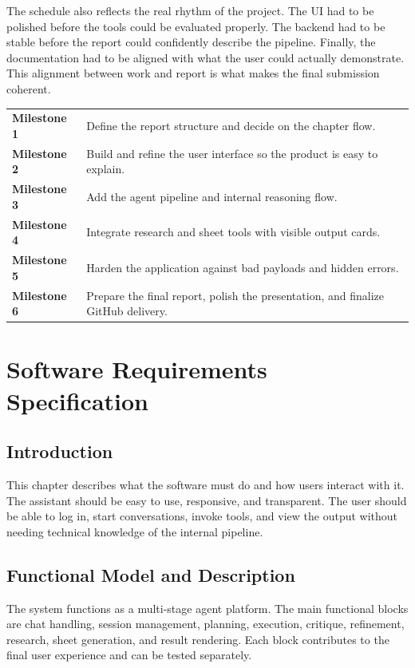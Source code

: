 \documentclass[11pt,oneside]{report}
\begin{document}
The schedule also reflects the real rhythm of the project. The UI had to be polished before the tools could be evaluated properly. The backend had to be stable before the report could confidently describe the pipeline. Finally, the documentation had to be aligned with what the user could actually demonstrate. This alignment between work and report is what makes the final submission coherent.

\begin{tabularx}{\textwidth}{>{\bfseries}p{}X}
Milestone 1 & Define the report structure and decide on the chapter flow. \\
Milestone 2 & Build and refine the user interface so the product is easy to explain. \\
Milestone 3 & Add the agent pipeline and internal reasoning flow. \\
Milestone 4 & Integrate research and sheet tools with visible output cards. \\
Milestone 5 & Harden the application against bad payloads and hidden errors. \\
Milestone 6 & Prepare the final report, polish the presentation, and finalize GitHub delivery. \\
\end{tabularx}

\chapter{Software Requirements Specification}
\section{Introduction}
This chapter describes what the software must do and how users interact with it. The assistant should be easy to use, responsive, and transparent. The user should be able to log in, start conversations, invoke tools, and view the output without needing technical knowledge of the internal pipeline.

\section{Functional Model and Description}
The system functions as a multi-stage agent platform. The main functional blocks are chat handling, session management, planning, execution, critique, refinement, research, sheet generation, and result rendering. Each block contributes to the final user experience and can be tested separately.
\end{document}
